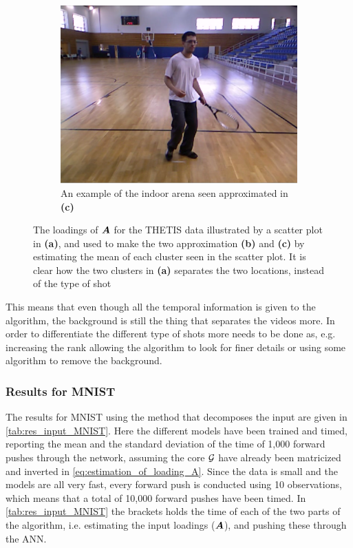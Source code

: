 \begin{figure}
\begin{subfigure}{.4\linewidth}
        \centering
        \captionsetup{width=.95\linewidth}
        \includegraphics[width=.78\linewidth]{Pics/06_results/loc_2_real.png}
        \caption{An example of the indoor arena seen approximated in \textbf{(c)}}
    \end{subfigure}
    \caption{The loadings of $\boldsymbol{A}$ for the THETIS data illustrated by a scatter plot in \textbf{(a)}, and used to make the two approximation \textbf{(b)} and \textbf{(c)} by estimating the mean of each cluster seen in the scatter plot. It is clear how the two clusters in \textbf{(a)} separates the two locations, instead of the type of shot}
    \label{fig:scatter_plot_THETIS}
\end{figure}
This means that even though all the temporal information is given to the algorithm, the background is still the thing that separates the videos more. In order to differentiate the different type of shots more needs to be done as, e.g. increasing the rank allowing the algorithm to look for finer details or using some algorithm to remove the background.

\subsubsection{Results for MNIST}
The results for MNIST using the method that decomposes the input are given in \autoref{tab:res_input_MNIST}. Here the different models have been trained and timed, reporting the mean and the standard deviation of the time of 1,000 forward pushes through the network, assuming the core $\mathcal{G}$ have already been matricized and inverted in \eqref{eq:estimation_of_loading_A}. Since the data is small and the models are all very fast, every forward push is conducted using 10 observations, which means that a total of 10,000 forward pushes have been timed. In \autoref{tab:res_input_MNIST}
the brackets holds the time of each of the two parts of the algorithm, i.e. estimating the input loadings ($\boldsymbol{A}$), and pushing these through the ANN. 

